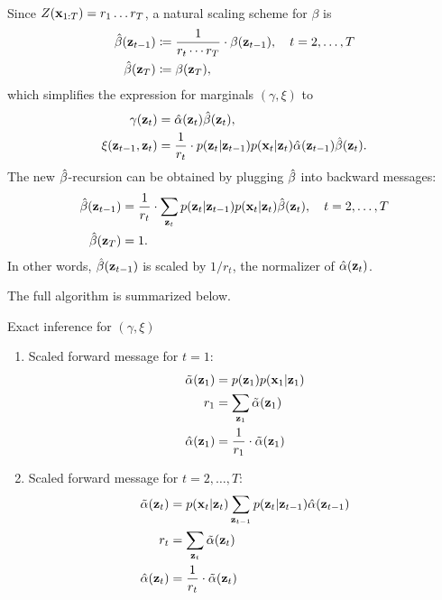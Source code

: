 \documentclass{article}
\begin{document}
\begin{enumerate}
\begin{align}
\end{align}
Since $ Z(\mathbf{x}_{1:T}) = r_1 \dotsc r_T $, a natural scaling scheme for $ \beta $ is
\begin{align}
\hat{\beta} (\mathbf{z}_{t-1}) 
& \coloneqq \frac{1}{r_t \cdots r_T} \cdot \beta (\mathbf{z}_{t-1}),  \quad t = 2, \dotsc, T \\
\hat{\beta} (\mathbf{z}_T) 
& \coloneqq \beta (\mathbf{z}_T),
\end{align}
which simplifies the expression for marginals $ (\gamma, \xi) $ to
\begin{align}
\gamma (\mathbf{z}_t)  
& = \hat{\alpha} (\mathbf{z}_t) \hat{\beta} (\mathbf{z}_t) , \\
\xi(\mathbf{z}_{t-1}, \mathbf{z}_t) 
& = \frac{1}{r_t} \cdot p(\mathbf{z}_t | \mathbf{z}_{t-1}) p(\mathbf{x}_t | \mathbf{z}_t)   \hat{\alpha}  (\mathbf{z}_{t-1}) \hat{\beta} (\mathbf{z}_t).
\end{align}
%
The new $ \hat{\beta} $-recursion can be obtained by plugging $ \hat{\beta} $ into backward messages:
\begin{align}
\hat{\beta} (\mathbf{z}_{t-1}) 
& = \frac{1}{r_t}  \cdot \sum_{\mathbf{z}_t} p(\mathbf{z}_t | \mathbf{z}_{t-1})   p(\mathbf{x}_t | \mathbf{z}_t) \hat{\beta} (\mathbf{z}_t) ,
\quad t = 2, \dotsc, T  \\
\hat{\beta} (\mathbf{z}_T) 
& = 1.
\end{align}
%
In other words, $ \hat{\beta} (\mathbf{z}_{t-1}) $ is scaled by $ 1 / r_t $, the normalizer of $ \hat{\alpha} (\mathbf{z}_t) $.

The full algorithm is summarized below.
 

\begin{algorithm}[h]
\caption{Exact inference for $ (\gamma, \xi) $}
\vspace{1ex}
\begin{enumerate} %
\item Scaled forward message for $ t = 1 $:
\begin{align}
\tilde{\alpha} (\mathbf{z}_1) 
& = p(\mathbf{z}_1) p(\mathbf{x}_1 | \mathbf{z}_1)  \\
r_1 
& =  \sum_{\mathbf{z}_1} \tilde{\alpha} (\mathbf{z}_1) \\
\hat{\alpha} (\mathbf{z}_1) 
& = \frac{1}{r_1} \cdot \tilde{\alpha} (\mathbf{z}_1)
\end{align}

\item Scaled forward message for $ t = 2, \dotsc, T $:
\begin{align}
\tilde{\alpha} (\mathbf{z}_t) 
& = p(\mathbf{x}_t | \mathbf{z}_t) \sum_{\mathbf{z}_{t-1}} p(\mathbf{z}_t | \mathbf{z}_{t-1})   \hat{\alpha} (\mathbf{z}_{t-1})  \\
r_t  
& =  \sum_{\mathbf{z}_t} \tilde{\alpha} (\mathbf{z}_t)  \\
\hat{\alpha} (\mathbf{z}_t) 
& = \frac{1}{r_t} \cdot \tilde{\alpha} (\mathbf{z}_t)
\end{align}


\end{enumerate}
\end{algorithm}
\end{enumerate}
\end{document}
